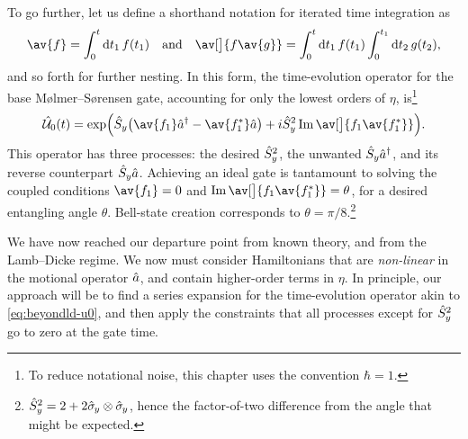 To go further, let us define a shorthand notation for iterated time integration as
\begin{equation}\label{eq:beyondld-av-notation}
\av{f} = \int_0^t\mathrm dt_1\,f(t_1) \quad\text{and}\quad \av[\big]{f \av{g}} = \int_0^t\mathrm dt_1\,f(t_1)\int_0^{t_1}\mathrm dt_2\,g(t_2),
\end{equation}
and so forth for further nesting.
In this form, the time-evolution operator for the base M\o lmer--S\o rensen gate, accounting for only the lowest orders of $\eta$, is\footnote{To reduce notational noise, this chapter uses the convention $\hbar = 1$.}
\begin{equation}\label{eq:beyondld-u0}
\U_0(t) = \exp\Bigl(\Sy\bigl(\av{f_1}\a^\dagger - \av{f_1^*}\a\bigr) + i\Sy^2\Im\av[\big]{f_1\av{f_1^*}}\Bigr).
\end{equation}
This operator has three processes: the desired $\hat{S}_y^2$, the unwanted $\hat{S}_y\hat{a}^\dagger$, and its reverse counterpart $\hat{S}_y\hat{a}$.
Achieving an ideal gate is tantamount to solving the coupled conditions $\av{f_1} = 0$ and $\Im\av[\big]{f_1\av{f_1^*}} = \theta$, for a desired entangling angle $\theta$.
Bell-state creation corresponds to $\theta = \pi/8$.\footnote{$\hat{S}_y^2 = 2 + 2\hat{\sigma}_{\mkern-1mu y}\otimes\hat{\sigma}_{\mkern-1mu y}$, hence the factor-of-two difference from the angle that might be expected.}

We have now reached our departure point from known theory, and from the Lamb--Dicke regime.
We now must consider Hamiltonians that are \emph{non-linear} in the motional operator $\hat{a}$, and contain higher-order terms in $\eta$.
In principle, our approach will be to find a series expansion for the time-evolution operator akin to \cref{eq:beyondld-u0}, and then apply the constraints that all processes except for $\hat{S}_y^2$ go to zero at the gate time.

